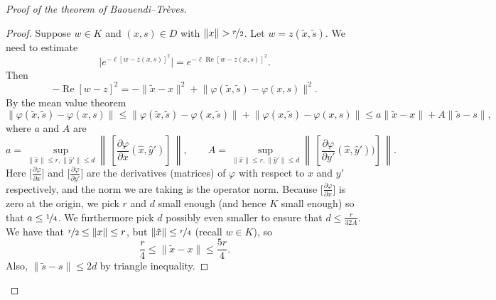 \documentclass[12pt,openany]{book}
\renewcommand{\Re}{\operatorname{Re}}
\newcommand{\snorm}[1]{\lVert {#1} \rVert}
\newcommand{\babs}[1]{\bigl\lvert {#1} \bigr\rvert}
\newcommand{\norm}[1]{\left\lVert {#1} \right\rVert}
\theoremstyle{plain}
\theoremstyle{remark}
\theoremstyle{definition}
\theoremstyle{exercise}
\theoremstyle{example}
\begin{document}
\begin{proof}[Proof of the theorem of Baouendi--Tr{\`e}ves]
\begin{proof}
Suppose $w \in K$ and $(x,s) \in D$ with $\snorm{x} > \nicefrac{r}{2}$.
Let $w = z(\tilde{x},\tilde{s})$.  
We need to estimate
\begin{equation*}
\babs{e^{ -\ell {[w - z(x,s)]}^2 }} =
e^{ -\ell \Re {[w - z(x,s)]}^2 } .
\end{equation*}
Then
\begin{equation*}
-\Re {[w - z]}^2 =
-\snorm{\tilde{x}-x}^2
+
\snorm{\varphi(\tilde{x},\tilde{s})-\varphi(x,s)}^2 .
\end{equation*}
By the mean value theorem
\begin{equation*}
\snorm{\varphi(\tilde{x},\tilde{s})-\varphi(x,s)}
\leq
\snorm{\varphi(\tilde{x},\tilde{s})-\varphi(x,\tilde{s})}
+
\snorm{\varphi(x,\tilde{s})-\varphi(x,s)}
\leq
a \snorm{\tilde{x}-x}
+
A \snorm{\tilde{s}-s} ,
\end{equation*}
where $a$ and $A$ are 
\begin{equation*}
a = \sup_{\snorm{\hat{x}} \leq r, \snorm{\hat{y}'} \leq d}
\norm{\,\left[\frac{\partial \varphi}{\partial x}(\hat{x},\hat{y}')\right]\,},
\qquad
A = \sup_{\snorm{\hat{x}} \leq r, \snorm{\hat{y}'} \leq d}
\norm{\,\left[\frac{\partial \varphi}{\partial y'}(\hat{x},\hat{y}'))\right]\,}.
\end{equation*}
Here $\bigl[ \frac{\partial \varphi}{\partial x} \bigr]$ and 
$\bigl[ \frac{\partial \varphi}{\partial y'} \bigr]$ are
the derivatives (matrices) of $\varphi$ with respect to $x$ and $y'$
respectively, and the norm we are taking is the operator norm.
Because $\bigl[ \frac{\partial \varphi}{\partial x} \bigr]$ is zero
at the origin, we pick $r$ and $d$ small
enough (and hence $K$ small enough) so that $a \leq \nicefrac{1}{4}$.
We furthermore pick $d$ possibly even smaller to ensure
that $d \leq \frac{r}{32A}$.  We have that $\nicefrac{r}{2} \leq \snorm{x} \leq
r$, but $\snorm{\tilde{x}} \leq \nicefrac{r}{4}$ (recall $w \in K$), so
\begin{equation*}
\frac{r}{4} \leq \snorm{\tilde{x}-x} \leq \frac{5r}{4} .
\end{equation*}
Also, $\snorm{\tilde{s}-s} \leq 2d$ by triangle inequality.


\end{proof}
\end{proof}
\end{document}
